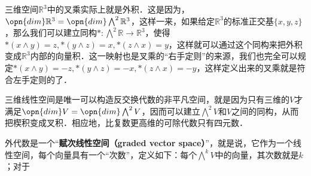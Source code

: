 三维空间$\mathbb{R}^3$中的叉乘实际上就是外积．这是因为，$\opn{dim}\mathbb{R}^3=\opn{dim}\bigwedge^2\mathbb{R}^3$，这样一来，如果给定$\mathbb{R}^3$的标准正交基$\{x, y, z\}$，那么我们可以建立同构$*: \bigwedge^2\mathbb{R}\rightarrow\mathbb{R}^3$，使得$*(x\wedge y)=z, *(y\wedge z)=x, *(z\wedge x)=y$，这样就可以通过这个同构来把外积变成$\mathbb{R}^3$内部的向量积．这一映射也是叉乘的“右手定则”的来源，我们也完全可以规定$*(x\wedge y)=-z, *(y\wedge z)=-x, *(z\wedge x)=-y$，这样定义出来的叉乘就是符合左手定则的了．

三维线性空间是唯一可以构造反交换代数的非平凡空间，就是因为只有三维的$V$才满足$\opn{dim}V=\opn{dim}\bigwedge^2V$，因而可以建立$\bigwedge^2 V$和$V$之间的同构，从而把楔积变成叉积．相应地，比复数更高维的可除代数只有四元数．

外代数是一个“\textbf{赋次线性空间（graded vector space）}”，就是说，它作为一个线性空间，每个向量具有一个“次数”，定义如下：每个$\bigwedge^kV$中的向量，其次数就是$k$；对于
